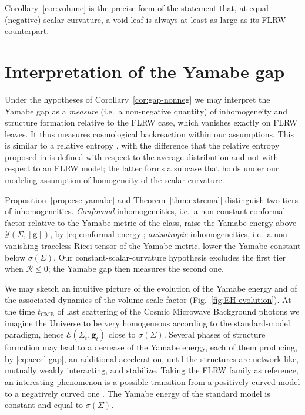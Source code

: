 \documentclass[aps,prd,reprint,amsmath,amssymb,nofootinbib,longbibliography]{revtex4-2}
\newcommand{\g}{\mathbf{g}}                 %
\newcommand{\Rs}{\mathcal{R}}               %
\newcommand{\EH}{\mathcal{E}}               %
\newcommand{\Y}{\mathcal{Y}}                %
\theoremstyle{plain}
\theoremstyle{definition}
\theoremstyle{remark}
\begin{document}
Corollary~\ref{cor:volume} is the precise form of the statement that, at equal (negative) scalar curvature, a void leaf is always at least as large as its FLRW counterpart.

\section{Interpretation of the Yamabe gap}
\label{sec:interpretation}

Under the hypotheses of Corollary~\ref{cor:gap-nonneg} we may interpret the Yamabe gap as a \emph{measure} (i.e.\ a non-negative quantity) of inhomogeneity and structure formation relative to the FLRW case, which vanishes exactly on FLRW leaves. It thus measures cosmological backreaction within our assumptions. This is similar to a relative entropy \cite{2004PhRvL92n1302H}, with the difference that the relative entropy proposed in \cite{2004PhRvL92n1302H} is defined with respect to the average distribution and not with respect to an FLRW model; the latter forms a subcase that holds under our modeling assumption of homogeneity of the scalar curvature.

Proposition~\ref{prop:csc-yamabe} and Theorem~\ref{thm:extremal} distinguish two tiers of inhomogeneities. \emph{Conformal} inhomogeneities, i.e.\ a non-constant conformal factor relative to the Yamabe metric of the class, raise the Yamabe energy above $\Y(\Sigma,[\g])$, by \eqref{eq:conformal-energy}; \emph{anisotropic} inhomogeneities, i.e.\ a non-vanishing traceless Ricci tensor of the Yamabe metric, lower the Yamabe constant below $\sigma(\Sigma)$. Our constant-scalar-curvature hypothesis excludes the first tier when $\Rs\le0$; the Yamabe gap then measures the second one.

We may sketch an intuitive picture of the evolution of the Yamabe energy and of the associated dynamics of the volume scale factor (Fig.~\ref{fig:EH-evolution}). At the time $t_{\mathrm{CMB}}$ of last scattering of the Cosmic Microwave Background photons we imagine the Universe to be very homogeneous according to the standard-model paradigm, hence $\EH(\Sigma_t,\g_t)$ close to $\sigma(\Sigma)$. Several phases of structure formation may lead to a decrease of the Yamabe energy, each of them producing, by \eqref{eq:accel-gap}, an additional acceleration, until the structures are network-like, mutually weakly interacting, and stabilize. Taking the FLRW family as reference, an interesting phenomenon is a possible transition from a positively curved model to a negatively curved one \cite{Heinesen_2020}. The Yamabe energy of the standard model is constant and equal to $\sigma(\Sigma)$.
\end{document}

